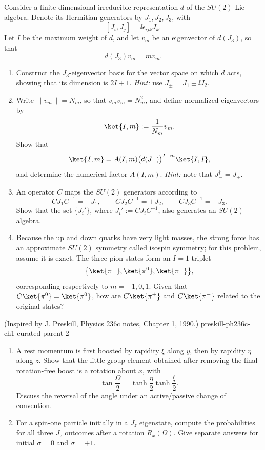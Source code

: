 \begin{enumerate}
Consider a finite-dimensional irreducible representation \(d\) of the
\(SU(2)\) Lie algebra.  Denote its Hermitian generators by
\(J_1,J_2,J_3\), with
\[
 [J_i,J_j]=\ii\epsilon_{ijk}J_k.
\]
Let \(I\) be the maximum weight of \(d\), and let \(v_m\) be an
eigenvector of \(d(J_3)\), so that
\[
 d(J_3)v_m=mv_m.
\]
\begin{enumerate}
\item[(a)] Construct the \(J_3\)-eigenvector basis for the vector space
on which \(d\) acts, showing that its dimension is \(2I+1\).
\emph{Hint:} use \(J_\pm=J_1\pm \ii J_2\).
\item[(b)] Write \(\lVert v_m\rVert=N_m\), so that
\(v_m^\dagger v_m=N_m^2\), and define normalized eigenvectors by
\[
 \ket{I,m}:=\frac1{N_m}v_m.
\]
Show that
\[
 \ket{I,m}=A(I,m)\bigl(d(J_-)\bigr)^{I-m}\ket{I,I},
\]
and determine the numerical factor \(A(I,m)\).
\emph{Hint:} note that \(J_-^\dagger=J_+\).
\item[(c)] An operator \(C\) maps the \(SU(2)\) generators according to
\[
 CJ_1C^{-1}=-J_1,\qquad
 CJ_2C^{-1}=+J_2,\qquad
 CJ_3C^{-1}=-J_3.
\]
Show that the set \(\{J_i'\}\), where \(J_i':=CJ_iC^{-1}\), also
generates an \(SU(2)\) algebra.
\item[(d)] Because the up and down quarks have very light masses, the
strong force has an approximate \(SU(2)\) symmetry called isospin
symmetry; for this problem, assume it is exact.  The three pion states
form an \(I=1\) triplet
\[
 \bigl\{\ket{\pi^-},\ket{\pi^0},\ket{\pi^+}\bigr\},
\]
corresponding respectively to \(m=-1,0,1\).  Given that
\(C\ket{\pi^0}=\ket{\pi^0}\), how are \(C\ket{\pi^+}\) and
\(C\ket{\pi^-}\) related to the original states?
\end{enumerate}

  {(Inspired by J. Preskill, Physics 236c notes, Chapter 1, 1990.)}
  {preskill-ph236c-ch1-curated-parent-2}
\begin{enumerate}
\item
A rest momentum is first boosted by rapidity \(\xi\) along \(y\), then by
rapidity \(\eta\) along \(z\).  Show that the little-group element obtained
after removing the final rotation-free boost is a rotation about \(x\),
with
\[
 \tan\frac{\Omega}{2}
 =\tanh\frac{\eta}{2}\tanh\frac{\xi}{2}.
\]
Discuss the reversal of the angle under an active/passive change of
convention.
\item
For a spin-one particle initially in a \(J_z\) eigenstate, compute the
probabilities for all three \(J_z\) outcomes after a rotation
\(R_x(\Omega)\).  Give separate answers for initial
\(\sigma=0\) and \(\sigma=+1\).
\end{enumerate}


\end{enumerate}
